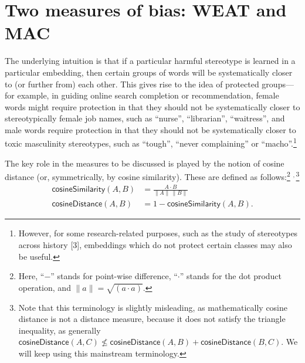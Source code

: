 \documentclass[
  12pt,
  dvipsnames,enabledeprecatedfontcommands]{scrartcl}
\begin{document}
\hypertarget{two-measures-of-bias-weat-and-mac}{%
\section{Two measures of bias: WEAT and
MAC}\label{two-measures-of-bias-weat-and-mac}}

\label{sec:two}

The underlying intuition is that if a particular harmful stereotype is
learned in a particular embedding, then certain groups of words will be
systematically closer to (or further from) each other. This gives rise
to the idea of protected groups---for example, in guiding online search
completion or recommendation, female words might require protection in
that they should not be systematically closer to stereotypically female
job names, such as ``nurse'', ``librarian'', ``waitress'', and male
words require protection in that they should not be systematically
closer to toxic masculinity stereotypes, such as ``tough'', ``never
complaining'' or ``macho''.\footnote{However, for some research-related
  purposes, such as the study of stereotypes across history {[}3{]},
  embeddings which do not protect certain classes may also be useful.}

The key role in the measures to be discussed is played by the notion of
cosine distance (or, symmetrically, by cosine similarity). These are
defined as follows:\footnote{Here, ``\(-\)'' stands for point-wise
  difference, ``\(\cdot\)'' stands for the dot product operation, and
  \(\lVert a\rVert = \sqrt{(a \cdot a)}\).}
\(^{\!\!\! , \,}\)\footnote{Note that this terminology is slightly
  misleading, as mathematically cosine distance is not a distance
  measure, because it does not satisfy the triangle inequality, as
  generally
  \(\mathsf{cosineDistance}(A,C) \not \leq \mathsf{cosineDistance}(A,B)+ \mathsf{cosineDistance}(B,C)\).
  We will keep using this mainstream terminology.}
\begin{align} \tag{Sim}
\mathsf{cosineSimilarity}(A,B) & = \frac{A \cdot B}{\lVert  A \rVert \,\lVert B \rVert}
\\
\tag{Distance}
\mathsf{cosineDistance}(A,B) &  = 1 - \mathsf{cosineSimilarity}(A,B).
\end{align}
\end{document}
